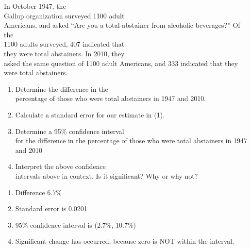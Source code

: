 \documentclass[11pt, chapterprefix=true]{scrbook}\usepackage[]{graphicx}\usepackage[]{color}
\begin{document}
\begin{exercises}
\begin{exercise} %
  
In October 1947, the \\ Gallup organization surveyed 1100 adult \\ Americans, and asked ``Are you a total abstainer from alcoholic beverages?''  Of the \\ 1100 adults surveyed, 407 indicated that \\ they were total abstainers.  In 2010, they  \\ asked the same question of 1100 adult Americans, and 333 indicated that they were total abstainers.  
  
\begin{enumerate}
\item Determine the difference in the \\ percentage of those who were total abstainers in 1947 and 2010.

\item Calculate a standard error for our estimate in (1).

\item Determine a 95\% confidence interval \\ for the difference in the percentage of those who were total abstainers in 1947 and 2010

\item Interpret the above confidence \\ intervals above in context.  Is it significant? Why or why not?

\end{enumerate}

\end{exercise}
\begin{solution}

\begin{enumerate}
\item Difference 6.7\% 

\item Standard error is 0.0201
\item  95\% confidence interval is (2.7\%, 10.7\%)

\item Significant change has occurred, because zero is NOT within the interval.

\end{enumerate}

\end{solution}

\end{exercises}
\end{document}
